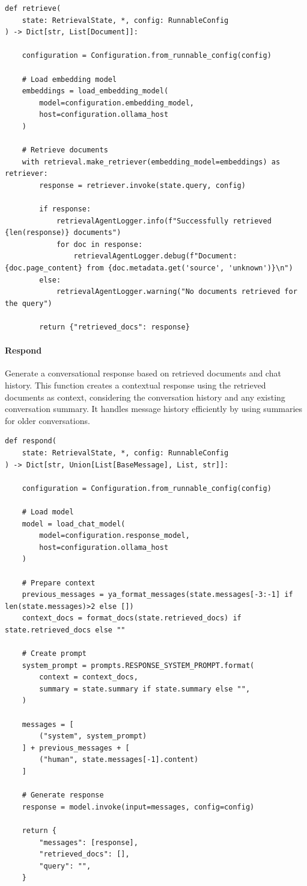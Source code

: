 \documentclass[11pt,a4paper]{report}
\begin{document}
\begin{lstlisting}[caption={Retrieve node}]
def retrieve(
    state: RetrievalState, *, config: RunnableConfig
) -> Dict[str, List[Document]]:

    configuration = Configuration.from_runnable_config(config)
    
    # Load embedding model
    embeddings = load_embedding_model(
        model=configuration.embedding_model, 
        host=configuration.ollama_host
    )

    # Retrieve documents
    with retrieval.make_retriever(embedding_model=embeddings) as retriever:
        response = retriever.invoke(state.query, config)
        
        if response:
            retrievalAgentLogger.info(f"Successfully retrieved {len(response)} documents")
            for doc in response:
                retrievalAgentLogger.debug(f"Document: {doc.page_content} from {doc.metadata.get('source', 'unknown')}\n")
        else:
            retrievalAgentLogger.warning("No documents retrieved for the query")
        
        return {"retrieved_docs": response}
\end{lstlisting}

\paragraph{Respond}

 Generate a conversational response based on retrieved documents and chat history. This function creates a contextual response using the retrieved documents as context, considering the conversation history and any existing conversation summary. It handles message history efficiently by using summaries for older conversations.

\begin{lstlisting}[caption={Respond node}]
def respond(
    state: RetrievalState, *, config: RunnableConfig
) -> Dict[str, Union[List[BaseMessage], List, str]]:

    configuration = Configuration.from_runnable_config(config)
    
    # Load model
    model = load_chat_model(
        model=configuration.response_model, 
        host=configuration.ollama_host
    )
    
    # Prepare context
    previous_messages = ya_format_messages(state.messages[-3:-1] if len(state.messages)>2 else [])
    context_docs = format_docs(state.retrieved_docs) if state.retrieved_docs else ""
    
    # Create prompt
    system_prompt = prompts.RESPONSE_SYSTEM_PROMPT.format(
        context = context_docs,
        summary = state.summary if state.summary else "",
    )

    messages = [
        ("system", system_prompt)
    ] + previous_messages + [
        ("human", state.messages[-1].content)
    ]

    # Generate response
    response = model.invoke(input=messages, config=config)

    return {
        "messages": [response],
        "retrieved_docs": [],
        "query": "",
    }
\end{lstlisting}
\end{document}
